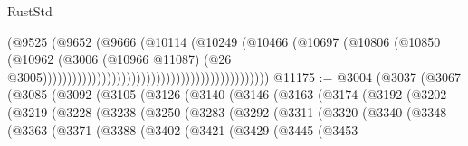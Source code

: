 \begin{lexlean}{RustStd}
\begin{coremodule}
                                                                        (@9525
                                                                          (@9652
                                                                            (@9666
                                                                              (@10114
                                                                                (@10249
                                                                                  (@10466
                                                                                    (@10697
                                                                                      (@10806
                                                                                        (@10850
                                                                                          (@10962
                                                                                            (@3006
                                                                                              (@10966
                                                                                                @11087)
                                                                                              (@26
                                                                                                @3005))))))))))))))))))))))))))))))))))))))))))))))
@11175 := @3004
    (@3037
      (@3067
        (@3085
          (@3092
            (@3105
              (@3126
                (@3140
                  (@3146
                    (@3163
                      (@3174
                        (@3192
                          (@3202
                            (@3219
                              (@3228
                                (@3238
                                  (@3250
                                    (@3283
                                      (@3292
                                        (@3311
                                          (@3320
                                            (@3340
                                              (@3348
                                                (@3363
                                                  (@3371
                                                    (@3388
                                                      (@3402
                                                        (@3421
                                                          (@3429
                                                            (@3445
                                                              (@3453

\end{coremodule}
\end{lexlean}
